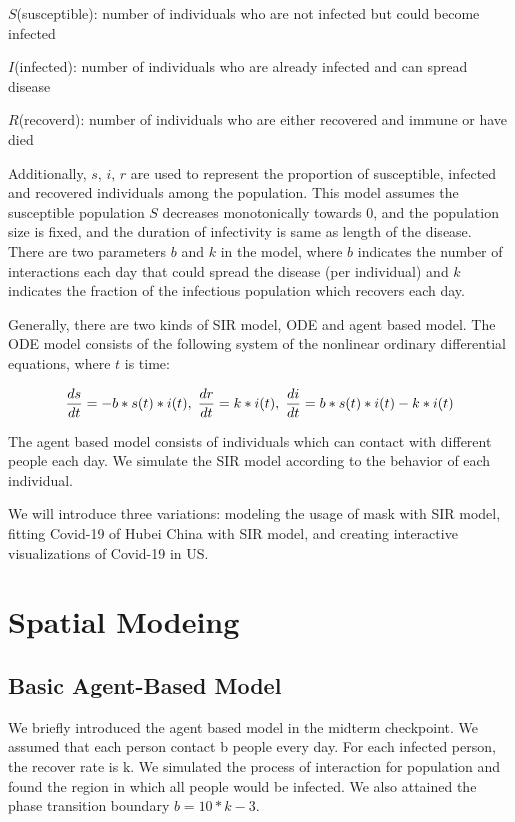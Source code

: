 \documentclass{article}
\begin{document}
$S$(susceptible): number of individuals who are not infected but could become infected

$I$(infected): number of individuals who are already infected and can spread disease

$R$(recoverd): number of individuals who are either recovered and immune or have died

\noindent
Additionally, $s$, $i$, $r$ are used to represent the proportion of susceptible, infected and recovered individuals among the population. This model assumes the susceptible population $S$ decreases monotonically towards 0, and the population size is fixed, and the duration of infectivity is same as length of the disease. There are two parameters $b$ and $k$ in the model, where $b$ indicates the number of interactions each day that could spread the disease (per individual) and $k$ indicates the fraction of the infectious population which recovers each day.

Generally, there are two kinds of SIR model, ODE and agent based model. The ODE model consists of the following system of the nonlinear ordinary differential equations, where $t$ is time:

$$\frac{ds}{dt} = -b * s(t) * i(t), \hspace{0.1cm}
\frac{dr}{dt} = k * i(t), \hspace{0.1cm}
\frac{di}{dt} = b * s(t) * i(t) - k * i(t)$$

\noindent
The agent based model consists of individuals which can contact with different people each day. We simulate the SIR model according to the behavior of each individual.  

We will introduce three variations: modeling the usage of mask with SIR model, fitting Covid-19 of Hubei China with SIR model, and creating interactive visualizations of Covid-19 in US. 



\section{Spatial Modeing}

\subsection{Basic Agent-Based Model}

We briefly introduced the agent based model in the midterm checkpoint. We assumed that each person contact b people every day. For each infected person, the recover rate is k. We simulated the process of interaction for population and found the region in which all people would be infected. We also attained the phase transition boundary $b = 10*k - 3$.
\end{document}
